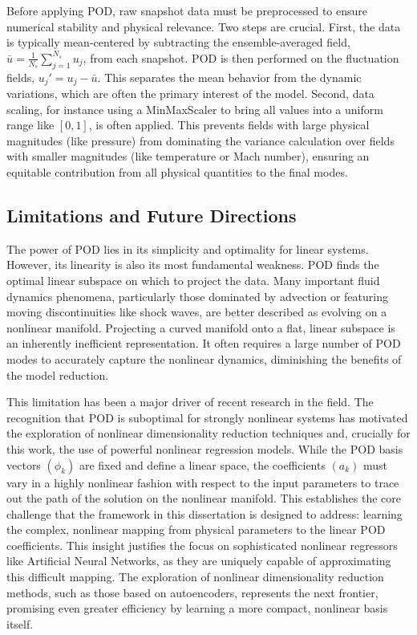 \documentclass[dsc, EN]{ufabcFHZh}
\begin{document}
{Before applying POD, raw snapshot data must be preprocessed to ensure numerical stability and physical relevance. Two steps are crucial. First, the data is typically mean-centered by subtracting the ensemble-averaged field, $\bar{u} = \frac{1}{N_s}\sum_{j=1}^{N_s} u_j$, from each snapshot. POD is then performed on the fluctuation fields, $u_j' = u_j - \bar{u}$. This separates the mean behavior from the dynamic variations, which are often the primary interest of the model. Second, data scaling, for instance using a MinMaxScaler to bring all values into a uniform range like $[0, 1]$, is often applied. This prevents fields with large physical magnitudes (like pressure) from dominating the variance calculation over fields with smaller magnitudes (like temperature or Mach number), ensuring an equitable contribution from all physical quantities to the final modes.


\subsection{Limitations and Future Directions}

The power of POD lies in its simplicity and optimality for linear systems. However, its linearity is also its most fundamental weakness. POD finds the optimal linear subspace on which to project the data. Many important fluid dynamics phenomena, particularly those dominated by advection or featuring moving discontinuities like shock waves, are better described as evolving on a nonlinear manifold. Projecting a curved manifold onto a flat, linear subspace is an inherently inefficient representation. It often requires a large number of POD modes to accurately capture the nonlinear dynamics, diminishing the benefits of the model reduction.

This limitation has been a major driver of recent research in the field. The recognition that POD is suboptimal for strongly nonlinear systems has motivated the exploration of nonlinear dimensionality reduction techniques and, crucially for this work, the use of powerful nonlinear regression models. While the POD basis vectors $(\phi_k)$ are fixed and define a linear space, the coefficients $(a_k)$ must vary in a highly nonlinear fashion with respect to the input parameters to trace out the path of the solution on the nonlinear manifold. This establishes the core challenge that the framework in this dissertation is designed to address: learning the complex, nonlinear mapping from physical parameters to the linear POD coefficients. This insight justifies the focus on sophisticated nonlinear regressors like Artificial Neural Networks, as they are uniquely capable of approximating this difficult mapping. The exploration of nonlinear dimensionality reduction methods, such as those based on autoencoders, represents the next frontier, promising even greater efficiency by learning a more compact, nonlinear basis itself.

}
\end{document}
